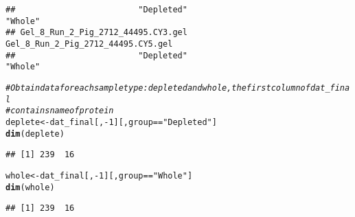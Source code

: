 \documentclass{article}\usepackage[]{graphicx}\usepackage[]{color}
\makeatletter
\newcommand{\hlnum}[1]{\textcolor[rgb]{0.686,0.059,0.569}{#1}}%
\newcommand{\hlstr}[1]{\textcolor[rgb]{0.192,0.494,0.8}{#1}}%
\newcommand{\hlcom}[1]{\textcolor[rgb]{0.678,0.584,0.686}{\textit{#1}}}%
\newcommand{\hlopt}[1]{\textcolor[rgb]{0,0,0}{#1}}%
\newcommand{\hlstd}[1]{\textcolor[rgb]{0.345,0.345,0.345}{#1}}%
\newcommand{\hlkwb}[1]{\textcolor[rgb]{0.69,0.353,0.396}{#1}}%
\newcommand{\hlkwd}[1]{\textcolor[rgb]{0.737,0.353,0.396}{\textbf{#1}}}%
\newenvironment{kframe}{%
 \def\at@end@of@kframe{}%
 \ifinner\ifhmode%
  \def\at@end@of@kframe{\end{minipage}}%
  \begin{minipage}{\columnwidth}%
 \fi\fi%
 \def\FrameCommand##1{\hskip\@totalleftmargin \hskip-\fboxsep
 \colorbox{shadecolor}{##1}\hskip-\fboxsep
     \hskip-\linewidth \hskip-\@totalleftmargin \hskip\columnwidth}%
 \MakeFramed {\advance\hsize-\width
   \@totalleftmargin\z@ \linewidth\hsize
   \@setminipage}}%
 {\par\unskip\endMakeFramed%
 \at@end@of@kframe}
\newenvironment{knitrout}{}{} %
\makeatother
\begin{document}
\begin{knitrout}
\begin{kframe}
\begin{verbatim}
##                         "Depleted"                            "Whole" 
## Gel_8_Run_2_Pig_2712_44495.CY3.gel Gel_8_Run_2_Pig_2712_44495.CY5.gel 
##                         "Depleted"                            "Whole"
\end{verbatim}
\begin{alltt}
\hlcom{# Obtain data for each sample type: depleted and whole, the first column of dat_final }
\hlcom{# contains name of protein}
\hlstd{deplete} \hlkwb{<-} \hlstd{dat_final[,}\hlopt{-}\hlnum{1}\hlstd{][,group}\hlopt{==}\hlstr{"Depleted"}\hlstd{]}
\hlkwd{dim}\hlstd{(deplete)}
\end{alltt}
\begin{verbatim}
## [1] 239  16
\end{verbatim}
\begin{alltt}
\hlstd{whole} \hlkwb{<-} \hlstd{dat_final[,}\hlopt{-}\hlnum{1}\hlstd{][,group}\hlopt{==}\hlstr{"Whole"}\hlstd{]}
\hlkwd{dim}\hlstd{(whole)}
\end{alltt}
\begin{verbatim}
## [1] 239  16
\end{verbatim}
\end{kframe}
\end{knitrout}
\end{document}
